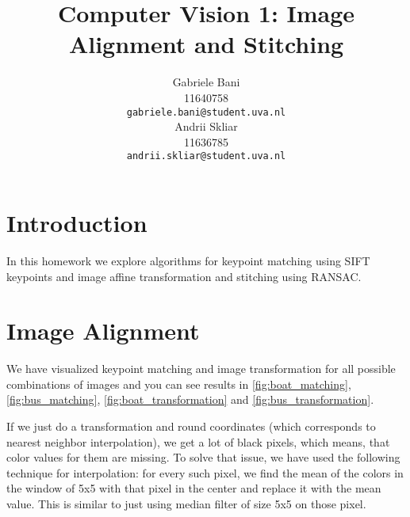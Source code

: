 \documentclass{article}
\title{Computer Vision 1: Image Alignment and Stitching}
\author{
	Gabriele Bani \\
	11640758 \\
  \texttt{gabriele.bani@student.uva.nl} \\
  \And
  	Andrii Skliar \\
  11636785 \\
  \texttt{andrii.skliar@student.uva.nl} \\
}
\begin{document}
\maketitle
\section*{Introduction}

In this homework we explore algorithms for keypoint matching using SIFT keypoints and image affine transformation and stitching using RANSAC.

\section{Image Alignment}
We have visualized keypoint matching and image transformation for all possible combinations of images and you can see results in \cref{fig:boat_matching}, \cref{fig:bus_matching}, \cref{fig:boat_transformation} and \cref{fig:bus_transformation}. 

If we just do a transformation and round coordinates (which corresponds to nearest neighbor interpolation), we get a lot of black pixels, which means, that color values for them are missing. To solve that issue, we have used the following technique for interpolation: for every such pixel, we find the mean of the colors in the window of 5x5 with that pixel in the center and replace it with the mean value. This is similar to just using median filter of size 5x5 on those pixel.
\end{document}
